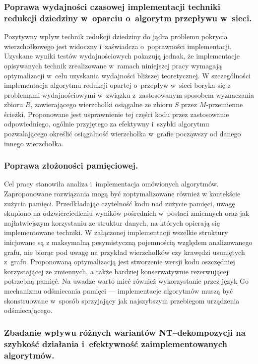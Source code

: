   \subsubsection{\textbf{Poprawa wydajności czasowej implementacji techniki redukcji dziedziny w~oparciu o~algorytm przepływu w~sieci.}}

  Pozytywny wpływ technik redukcji dziedziny do jądra problemu pokrycia wierzchołkowego jest widoczny i~zaświadcza o~poprawności implementacji.
  Uzyskane wyniki testów wydajnościowych pokazują jednak, że implementacje opisywanych technik zrealizowane w~ramach niniejszej pracy wymagają optymalizacji w~celu uzyskania wydajności bliższej teoretycznej.
  W szczególności implementacja algorytmu redukcji opartej o~przepływ w~sieci boryka się z problemami wydajnościowymi w~związku z~zastosowanym sposobem wyznaczania zbioru $R$, zawierającego wierzchołki osiągalne ze zbioru $S$ przez $M$-przemienne ścieżki.
  Proponowane jest usprawnienie tej części kodu przez zastosowanie odpowiedniego, ogólnie przyjętego za efektywny i~szybki algorytmu pozwalającego określić osiągalność wierzchołka w~grafie począwszy od danego innego wierzchołka.

  \subsubsection{\textbf{Poprawa złożoności pamięciowej.}}

  Cel pracy stanowiła analiza i~implementacja omówionych algorytmów.
  Zaproponowane rozwiązania mogą być zoptymalizowane również w kontekście zużycia pamięci.
  Przedkładając czytelność kodu nad zużycie pamięci, uwagę skupiono na odzwierciedleniu wyników pośrednich w~postaci zmiennych oraz jak najłatwiejszym korzystaniu ze struktur danych, na których opierają się implementowane techniki.
  W załączonej implementacji wszelkie struktury inicjowane są z maksymalną pesymistyczną pojemnością względem analizowanego grafu, nie biorąc pod uwagę na przykład wierzchołków czy krawędzi usuniętych z~grafu.
  Proponowaną optymalizacją jest stworzenie wersji kodu oszczędniej korzystającej ze zmiennych, a także bardziej konserwatywnie rezerwującej potrzebną pamięć.
  Na uwadze warto mieć również wykorzystanie przez język Go mechanizmu odśmiecania pamięci --- implementacje algorytmów muszą być skonstruowane w~sposób sprzyjający jak najszybszym przebiegom urządzenia odśmiecającego.

  \subsubsection{\textbf{Zbadanie wpływu różnych wariantów NT--dekompozycji na szybkość działania i~efektywność zaimplementowanych algorytmów.}}

